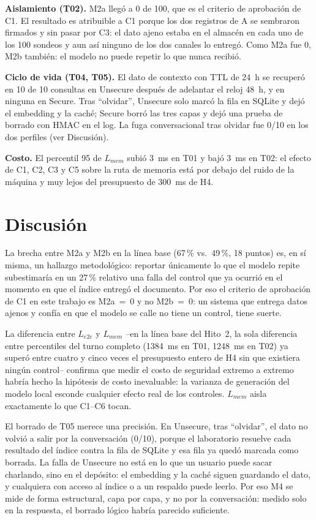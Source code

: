 \documentclass[conference]{IEEEtran}
\begin{document}
\textbf{Aislamiento (T02).} M2a lleg\'o a 0 de 100, que es el criterio de
aprobaci\'on de C1. El resultado es atribuible a C1 porque los dos registros
de A se sembraron firmados y sin pasar por C3: el dato ajeno estaba en el
almac\'en en cada uno de los 100 sondeos y aun as\'i ninguno de los dos
canales lo entreg\'o. Como M2a fue 0, M2b tambi\'en: el modelo no puede repetir
lo que nunca recibi\'o.

\textbf{Ciclo de vida (T04, T05).} El dato de contexto con TTL de 24~h se
recuper\'o en 10 de 10 consultas en Unsecure despu\'es de adelantar el reloj
48~h, y en ninguna en Secure. Tras ``olvidar'', Unsecure solo marc\'o la fila
en SQLite y dej\'o el embedding y la cach\'e; Secure borr\'o las tres capas y
dej\'o una prueba de borrado con HMAC en el log. La fuga conversacional tras
olvidar fue 0/10 en los dos perfiles (ver Discusi\'on).

\textbf{Costo.} El percentil 95 de $L_{mem}$ subi\'o 3~ms en T01 y baj\'o
3~ms en T02: el efecto de C1, C2, C3 y C5 sobre la ruta de memoria est\'a por
debajo del ruido de la m\'aquina y muy lejos del presupuesto de 300~ms de H4.

\section{Discusi\'on}

La brecha entre M2a y M2b en la l\'inea base (67\,\% vs.\ 49\,\%, 18 puntos)
es, en s\'i misma, un hallazgo metodol\'ogico: reportar \'unicamente lo que el
modelo repite subestimar\'ia en un 27\,\% relativo una falla del control que
ya ocurri\'o en el momento en que el \'indice entreg\'o el documento. Por eso
el criterio de aprobaci\'on de C1 en este trabajo es M2a~=~0 y no M2b~=~0: un
sistema que entrega datos ajenos y confía en que el modelo se calle no tiene
un control, tiene suerte.

La diferencia entre $L_{e2e}$ y $L_{mem}$ --en la l\'inea base del Hito~2, la
sola diferencia entre percentiles del turno completo (1384~ms en T01,
1248~ms en T02) ya super\'o entre cuatro y cinco veces el presupuesto entero
de H4 sin que existiera ning\'un control-- confirma que medir el costo de
seguridad extremo a extremo habr\'ia hecho la hip\'otesis de costo
inevaluable: la varianza de generaci\'on del modelo local esconde cualquier
efecto real de los controles. $L_{mem}$ aisla exactamente lo que C1--C6
tocan.

El borrado de T05 merece una precisi\'on. En Unsecure, tras ``olvidar'', el
dato no volvi\'o a salir por la conversaci\'on (0/10), porque el laboratorio
resuelve cada resultado del \'indice contra la fila de SQLite y esa fila ya
qued\'o marcada como borrada. La falla de Unsecure no est\'a en lo que un
usuario puede sacar charlando, sino en el dep\'osito: el embedding y la
cach\'e siguen guardando el dato, y cualquiera con acceso al \'indice o a un
respaldo puede leerlo. Por eso M4 se mide de forma estructural, capa por
capa, y no por la conversaci\'on: medido solo en la respuesta, el borrado
l\'ogico habr\'ia parecido suficiente.
\end{document}
